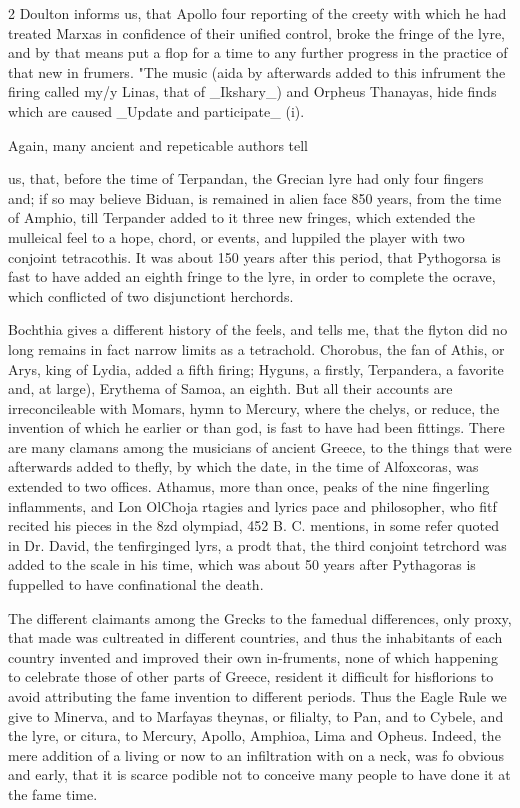 \documentclass[10pt]{article}
\begin{document}
\begin{multicols}{2}
Doulton informs us, that Apollo four reporting of the creety with which he had treated Marxas in confidence of their unified control, broke the fringe of the lyre, and by that means put a flop for a time to any further progress in the practice of that new in frumers. "The music (aida by afterwards added to this infrument the firing called my/y Linas, that of \_Ikshary\_) and Orpheus Thanayas, hide finds which are caused \_Update and participate\_ (i).

Again, many ancient and repeticable authors tell

us, that, before the time of Terpandan, the Grecian lyre had only four fingers and; if so may believe Biduan, is remained in alien face 850 years, from the time of Amphio, till Terpander added to it three new fringes, which extended the mulleical feel to a hope, chord, or events, and luppiled the player with two conjoint tetracothis. It was about 150 years after this period, that Pythogorsa is fast to have added an eighth fringe to the lyre, in order to complete the ocrave, which conflicted of two disjunctiont herchords.

Bochthia gives a different history of the feels, and tells me, that the flyton did no long remains in fact narrow limits as a tetrachold. Chorobus, the fan of Athis, or Arys, king of Lydia, added a fifth firing; Hyguns, a firstly, Terpandera, a favorite and, at large), Erythema of Samoa, an eighth. But all their accounts are irreconcileable with Momars, hymn to Mercury, where the chelys, or reduce, the invention of which he earlier or than god, is fast to have had been fittings. There are many clamans among the musicians of ancient Greece, to the things that were afterwards added to thefly, by which the date, in the time of Alfoxcoras, was extended to two offices. Athamus, more than once, peaks of the nine fingerling inflamments, and Lon OlChoja rtagies and lyrics pace and philosopher, who fitf recited his pieces in the 8zd olympiad, 452 B. C. mentions, in some refer quoted in Dr. David, the tenfirginged lyrs, a prodt that, the third conjoint tetrchord was added to the scale in his time, which was about 50 years after Pythagoras is fuppelled to have confinational the death.

The different claimants among the Grecks to the famedual differences, only proxy, that made was cultreated in different countries, and thus the inhabitants of each country invented and improved their own in-fruments, none of which happening to celebrate those of other parts of Greece, resident it difficult for hisflorions to avoid attributing the fame invention to different periods. Thus the Eagle Rule we give to Minerva, and to Marfayas theynas, or filialty, to Pan, and to Cybele, and the lyre, or citura, to Mercury, Apollo, Amphioa, Lima and Opheus. Indeed, the mere addition of a living or now to an infiltration with on a neck, was fo obvious and early, that it is scarce podible not to conceive many people to have done it at the fame time.


\end{multicols}
\end{document}
